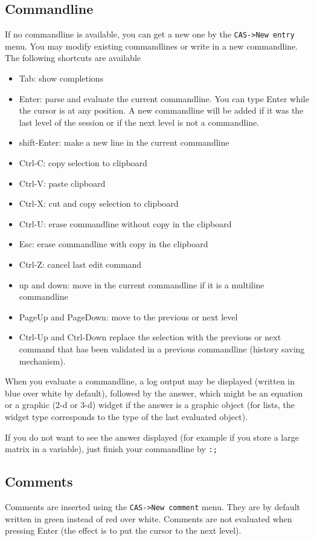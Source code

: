 \documentclass{article}
\begin{document}
\subsection{Commandline}
If no commandline is available, you can get a new one by the 
\verb|CAS->New entry|
menu. You may modify existing commandlines or write in a new
commandline. The following shortcuts are available
\begin{itemize}
\item Tab: show completions
\item Enter: parse and evaluate the current commandline. You can
type Enter while the cursor is at any position. A new commandline
will be added if it was the last level of the session or if
the next level is not a commandline.
\item shift-Enter: make a new line in the current commandline
\item Ctrl-C: copy selection to clipboard
\item Ctrl-V: paste clipboard
\item Ctrl-X: cut and copy selection to clipboard
\item Ctrl-U: erase commandline without copy in the clipboard
\item Esc: erase commandline with copy in the clipboard
\item Ctrl-Z: cancel last edit command
\item up and down: move in the current commandline if it is a
  multiline commandline
\item PageUp and PageDown: move to the previous or next level
\item Ctrl-Up and Ctrl-Down replace the selection with the previous
or next command that has been validated in a previous commandline
(history saving mechanism).
\end{itemize}
When you evaluate a commandline, a log output may be displayed
(written in blue over white by default), followed by the answer, which
might be an equation or a graphic (2-d or 3-d) widget if the
answer is a graphic object (for lists, the widget type corresponds
to the type of the last evaluated object).

If you do not want to see the answer displayed (for example if
you store a large matrix in a variable), just finish
your commandline by \verb|:;|

\subsection{Comments}
Comments are inserted using the \verb|CAS->New comment| menu.
They are by default written in green instead of red over white.
Comments are not evaluated when pressing Enter (the effect is to
put the cursor to the next level).
\end{document}

